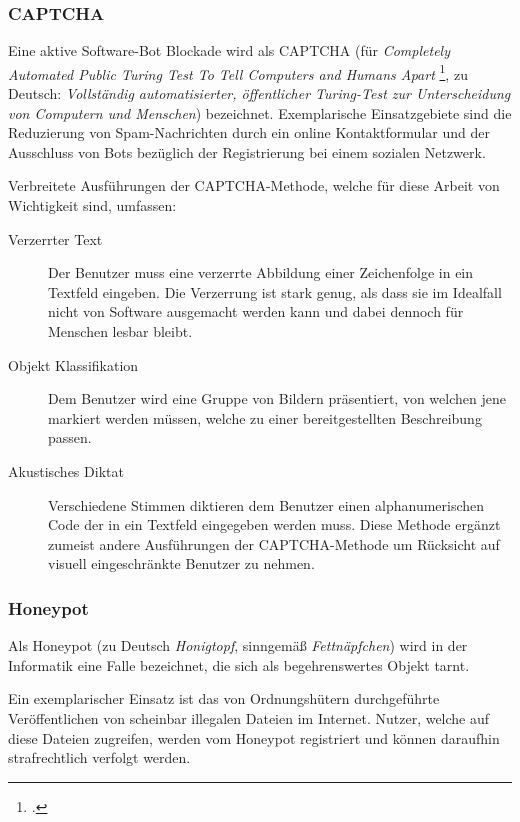 \subsubsection{CAPTCHA} %
\label{ssub:captcha}
Eine aktive Software-Bot Blockade wird als CAPTCHA (für \emph{Completely
Automated Public Turing Test To Tell Computers and Humans Apart}
\footcite{captchaNet}, zu Deutsch: \emph{Vollständig automatisierter,
öffentlicher Turing-Test zur Unterscheidung von Computern und Menschen})
bezeichnet. Exemplarische Einsatzgebiete sind die Reduzierung von
Spam-Nachrichten durch ein online Kontaktformular und der Ausschluss von Bots
bezüglich der Registrierung bei einem sozialen Netzwerk.

Verbreitete Ausführungen der CAPTCHA-Methode, welche für diese Arbeit von
Wichtigkeit sind, umfassen:

\begin{description}
  \item[Verzerrter Text]
  Der Benutzer muss eine verzerrte Abbildung einer Zeichenfolge in ein Textfeld
  eingeben. Die Verzerrung ist stark genug, als dass sie im Idealfall nicht von
  Software ausgemacht werden kann und dabei dennoch für Menschen lesbar bleibt.
  
  \item[Objekt Klassifikation]
  Dem Benutzer wird eine Gruppe von Bildern präsentiert, von welchen jene
  markiert werden müssen, welche zu einer bereitgestellten Beschreibung passen.
  
  \item[Akustisches Diktat]
  Verschiedene Stimmen diktieren dem Benutzer einen alphanumerischen Code der
  in ein Textfeld eingegeben werden muss. Diese Methode ergänzt zumeist andere
  Ausführungen der CAPTCHA-Methode um Rücksicht auf visuell eingeschränkte
  Benutzer zu nehmen.
\end{description}

\subsubsection{Honeypot} %
\label{ssub:honeypot}
Als Honeypot (zu Deutsch \emph{Honigtopf}, sinngemäß \emph{Fettnäpfchen}) wird
in der Informatik eine Falle bezeichnet, die sich als begehrenswertes Objekt
tarnt.

Ein exemplarischer Einsatz ist das von Ordnungshütern durchgeführte
Veröffentlichen von scheinbar illegalen Dateien im Internet. Nutzer, welche auf
diese Dateien zugreifen, werden vom Honeypot registriert und können daraufhin
strafrechtlich verfolgt werden.

